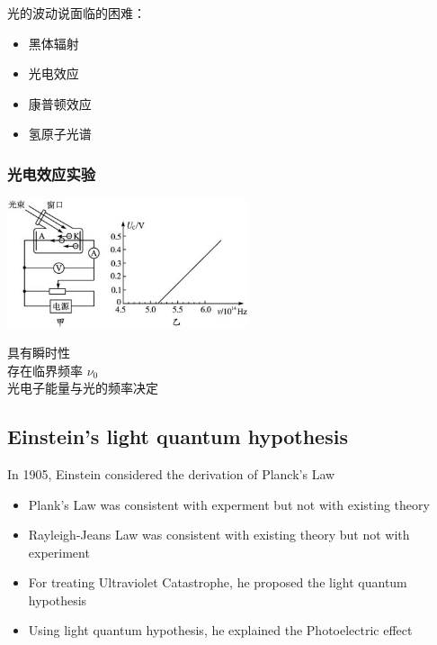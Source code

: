 \begin{frame} 
    光的波动说面临的困难：
    \begin{itemize}
        \item 黑体辐射
        \item 光电效应
        \item 康普顿效应
        \item 氢原子光谱
    \end{itemize}
\end{frame}

\begin{frame} 
    \frametitle{光电效应实验}   
    \begin{center}
       \includegraphics[width=0.53\textwidth]{figs/2021-12-02-16-01-21.png}
   \end{center}  
   \bullet 具有瞬时性 \\
   \bullet 存在临界频率 $\nu_0$ \\
   \bullet 光电子能量与光的频率决定
\end{frame}  

\subsection{Einstein's light quantum hypothesis}

\begin{frame} 
    In 1905, Einstein considered the derivation of Planck's Law  \\
    \begin{itemize}
        \item Plank’s Law was consistent with experment but not with existing theory
        \item Rayleigh-Jeans Law was consistent with existing theory but not with experiment
        \item For treating Ultraviolet Catastrophe, he proposed the light quantum hypothesis
        \item Using light quantum hypothesis, he explained the Photoelectric effect
    \end{itemize}
\end{frame}

